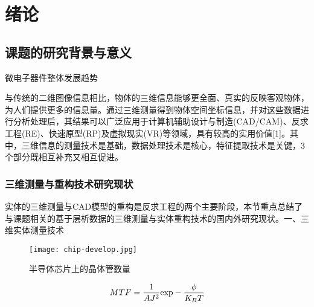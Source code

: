     
\chapter{绪\quad 论}
\section{课题的研究背景与意义}

\begin{shaded}
    微电子器件整体发展趋势  
    \end{shaded}
    与传统的二维图像信息相比，物体的三维信息能够更全面、真实的反映客观物体，为人们提供更多的信息量。通过三维测量得到物体空间坐标信息，并对这些数据进行分析处理后，其结果可以广泛应用于计算机辅助设计与制造(CAD/CAM)、反求工程(RE)、快速原型(RP)及虚拟现实(VR)等领域，具有较高的实用价值[1]。其中，三维信息的测量技术是基础，数据处理技术是核心，特征提取技术是关键，3个部分既相互补充又相互促进。

\subsection{三维测量与重构技术研究现状}
实体的三维测量与CAD模型的重构是反求工程的两个主要阶段，本节重点总结了与课题相关的基于层析数据的三维测量与实体重构技术的国内外研究现状。一、三维实体测量技术


    \begin{figure}[h]
        \texttt{[image: chip-develop.jpg]}
        \caption{半导体芯片上的晶体管数量}
        \label{chip-develop}
        \end{figure}


    \begin{equation}
        MTF = \frac{1}{{A{J^2}}}{\rm{exp}} - \frac{\phi }{{{K_B}T}}
        \label{MTF}
        \end{equation}



